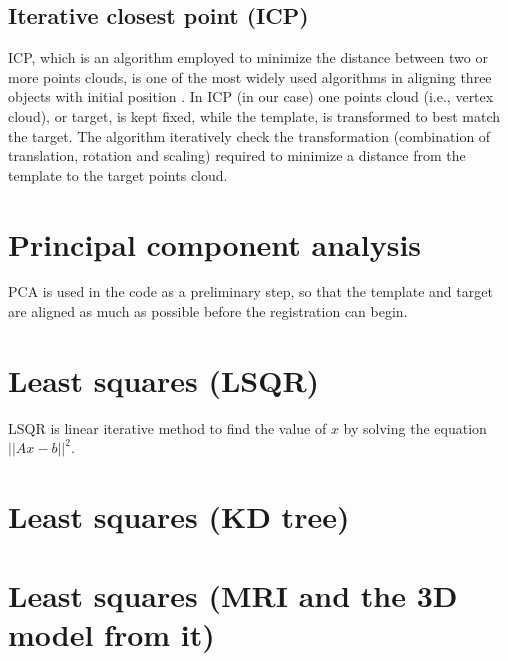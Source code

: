 \documentclass[../structure.tex]{subfiles}
\begin{document}
		\subsection{Iterative closest point (ICP)}
		 ICP, which is an algorithm employed to minimize the distance between two or more points clouds, is one of the most widely used algorithms in aligning three objects with initial position \cite{Zhang1994}.
		 In ICP (in our case) one points cloud (i.e., vertex cloud), or target, is kept fixed, while the template, is transformed to best match the target. The algorithm iteratively check the transformation (combination of translation, rotation and scaling) required to minimize a distance from the template to the target points cloud.
\section{Principal component analysis}
PCA is used in the code as a preliminary step, so that the template and target are aligned as much as possible before the registration can begin.
\section{Least squares (LSQR)}
LSQR is linear iterative method to find the value of $x$ by solving the equation $||Ax-b||^2$.

\section{Least squares (KD tree)}

\section{Least squares (MRI and the 3D model from it)}
\end{document}
